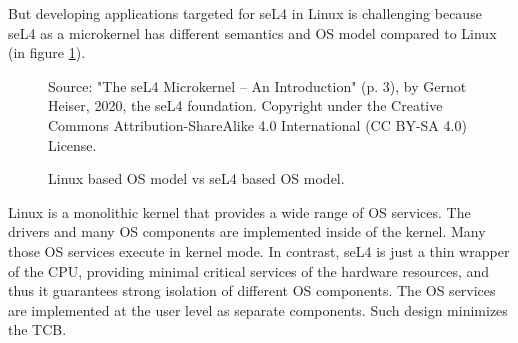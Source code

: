 But developing applications targeted for seL4 in Linux is challenging because seL4 as a microkernel has different semantics and OS model compared to Linux (in figure \ref{fig:osmodel}).

\begin{figure}[h] %
    \centering
    {Source: "The seL4 Microkernel – An Introduction" (p. 3), by Gernot Heiser, 2020, the seL4 foundation. Copyright  under the Creative Commons Attribution-ShareAlike 4.0 International (CC BY-SA 4.0) License.}
    
    \caption{Linux based OS model vs seL4 based OS model.}
    \label{fig:osmodel}
\end{figure}

Linux is a monolithic kernel that provides a wide range of OS services. The drivers and many OS components are implemented inside of the kernel. Many those OS services execute in kernel mode. In contrast, seL4 is just a thin wrapper of the CPU, providing minimal critical services of the hardware resources, and thus it guarantees strong isolation of different OS components. The OS services are implemented at the user level as separate components. Such design minimizes the TCB. 

